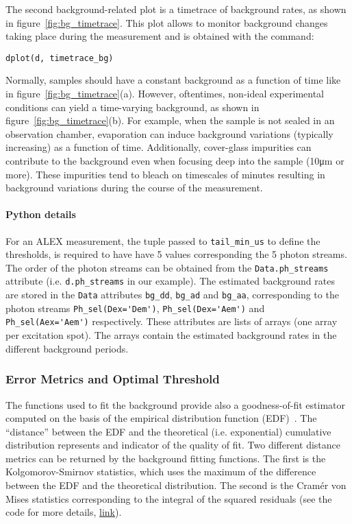 The second background-related plot is a timetrace of background rates, 
as shown in figure~\ref{fig:bg_timetrace}. This plot allows to monitor background changes
taking place during the measurement and is obtained with the command:

\begin{lstlisting}
dplot(d, timetrace_bg)
\end{lstlisting}

Normally, samples should have a constant background as a function of time
like in figure~\ref{fig:bg_timetrace}(a). However, oftentimes, non-ideal
experimental conditions can yield a time-varying background, as shown in
figure~\ref{fig:bg_timetrace}(b).
For example, when the sample is not sealed in an observation chamber,
evaporation can induce background variations (typically increasing)
as a function of time. Additionally,
cover-glass impurities can contribute to the background even when focusing 
deep into the sample (10μm or more).
These impurities tend to bleach on timescales of minutes resulting in
background variations during the course of the measurement.

\paragraph{Python details} For an ALEX measurement, the tuple passed to
\verb|tail_min_us| to define the thresholds, is required to have have 
5 values corresponding the 5 photon streams. 
The order of the photon streams can be obtained from
the \verb|Data.ph_streams| attribute (i.e. \verb|d.ph_streams| in our example).
The estimated background rates are stored in the \verb|Data| attributes
\verb|bg_dd|, \verb|bg_ad| and \verb|bg_aa|, corresponding to the photon
streams \verb|Ph_sel(Dex='Dem')|, \verb|Ph_sel(Dex='Aem')| and \verb|Ph_sel(Aex='Aem')|
respectively. These attributes are lists of arrays (one array per excitation spot).
The arrays contain the estimated background rates in the different background periods.

\subsubsection{Error Metrics and Optimal Threshold}

The functions used to fit the background provide also a goodness-of-fit estimator 
computed on the basis of the empirical distribution function (EDF)~\cite{Stephens1974,Parr1980}. 
The ``distance'' between the EDF and the theoretical (i.e. exponential) cumulative distribution
represents and indicator of the quality of fit.
Two different distance metrics can be returned by the background fitting functions.
The first is the Kolgomorov-Smirnov statistics, which uses the maximum of the difference 
between the EDF and the theoretical distribution. The second is the Cramér von Mises
statistics corresponding to the integral of the squared residuals
(see the code for more details,
\href{https://github.com/tritemio/FRETBursts/blob/master/fretbursts/background.py#L41}{link}).

